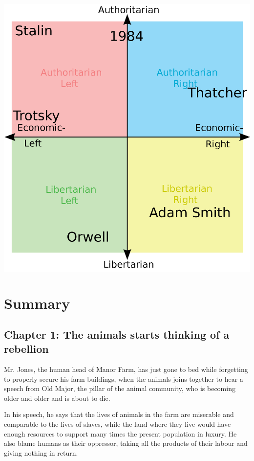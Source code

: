 \documentclass{article}
\begin{document}
    \begin{center}
        \includegraphics[width=\textwidth]{political_compass.png}
    \end{center}

    \section{Summary}
    \subsection{Chapter 1: The animals starts thinking of a rebellion}
    Mr. Jones, the human head of Manor Farm, has just gone to bed while forgetting to properly secure his farm buildings, when the animals joins together to hear a speech from Old Major, the pillar of the animal community, who is becoming older and older and is about to die.
    
    In his speech, he says that the lives of animals in the farm are miserable and comparable to the lives of slaves, while the land where they live would have enough resources to support many times the present population in luxury. He also blame humans as their oppressor, taking all the products of their labour and giving nothing in return.
    
\end{document}
